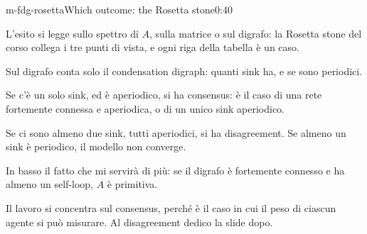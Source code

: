 \begin{slide}{m-fdg-rosetta}{Which outcome: the Rosetta stone}{0:40}
  \begin{discorso}
    \item L'esito si legge sullo spettro di $A$, sulla matrice o sul digrafo: la Rosetta stone del corso collega i tre punti di {\color{red}} {\color{blue}vista, e ogni riga della tabella è un caso.}
    \item Sul digrafo conta solo il condensation digraph: quanti sink {\color{red}} {\color{blue}ha,} e se sono periodici.
    \item {\color{red}} {\color{blue}Se c'è un} solo sink, {\color{blue}ed è} aperiodico, {\color{red}} {\color{blue}si ha consensus: è} il {\color{red}  } {\color{blue}caso di una rete fortemente connessa} e {\color{red}           } {\color{blue}aperiodica, o di un unico} sink {\color{red}       } {\color{blue}aperiodico.}
    \item {\color{blue}Se ci sono almeno due sink, tutti aperiodici, si ha disagreement. Se almeno un sink è periodico, il modello non converge.}
    \item {\color{red}} {\color{blue}In basso il fatto che mi} servirà {\color{red}   } {\color{blue}di più:} se il digrafo è fortemente connesso e ha almeno un self-loop, $A$ è primitiva.
    \item Il lavoro si concentra sul {\color{red}} {\color{blue}consensus,} perché è il caso in cui il peso di ciascun agente si può misurare. Al {\color{red}} {\color{blue}disagreement} dedico la slide dopo.
  \end{discorso}
\end{slide}


